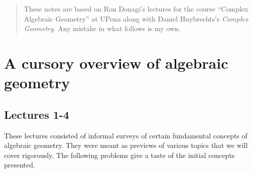 \documentclass[10pt,letterpaper,cm]{nupset}
\theoremstyle{definition}
\theoremstyle{theorem}
\theoremstyle{remark}
\newcommand{\1}{\mathbb{1}}
\newcommand{\0}{\vec 0}
\begin{document}
\thispagestyle{empty}
\begin{abstract}
These notes are based on Ron Donagi's lectures for the course ``Complex Algebraic Geometry'' at UPenn along with Daniel Huybrechts's \textit{Complex Geometry}. Any mistake in what follows is my own.
\end{abstract}

\tableofcontents
\newpage

\section{A cursory overview of algebraic geometry} 

\subsection{Lectures 1-4}

These lectures consisted of informal surveys of certain fundamental concepts of algebraic geometry. They were meant as previews of various topics that we will cover rigorously. The following problems give a taste of the initial concepts presented.

\medskip
\end{document}

